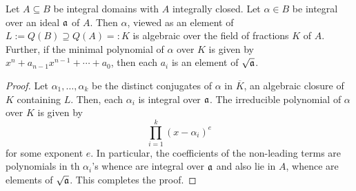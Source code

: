 \begin{proposition}
    Let $A\subseteq B$ be integral domains with $A$ integrally closed. Let $\alpha\in B$ be integral over an ideal $\mathfrak a$ of $A$. Then $\alpha$, viewed as an element of $L := Q(B)\supseteq Q(A) =: K$ is algebraic over the field of fractions $K$ of $A$. Further, if the minimal polynomial of $\alpha$ over $K$ is given by $x^n + a_{n - 1}x^{n - 1} + \cdots + a_0$, then each $a_i$ is an element of $\sqrt{\mathfrak a}$.
\end{proposition}
\begin{proof}
    Let $\alpha_1,\dots,\alpha_k$ be the distinct conjugates of $\alpha$ in $\overline K$, an algebraic closure of $K$ containing $L$. Then, each $\alpha_i$ is integral over $\mathfrak a$. The irreducible polynomial of $\alpha$ over $K$ is given by 
    \begin{equation*}
        \prod_{i = 1}^k \left(x - \alpha_i\right)^{e}
    \end{equation*}
    for some exponent $e$. In particular, the coefficients of the non-leading terms are polynomials in th $\alpha_i$'s whence are integral over $\mathfrak a$ and also lie in $A$, whence are elements of $\sqrt{\mathfrak a}$. This completes the proof.
\end{proof}

